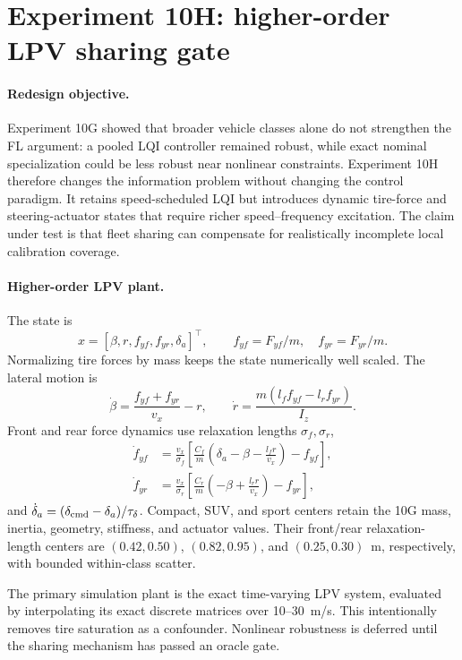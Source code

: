 \section{Experiment 10H: higher-order LPV sharing gate}
\label{sec:experiment10h}

\paragraph{Redesign objective.}
Experiment 10G showed that broader vehicle classes alone do not strengthen the
FL argument: a pooled LQI controller remained robust, while exact nominal
specialization could be less robust near nonlinear constraints. Experiment
10H therefore changes the information problem without changing the control
paradigm. It retains speed-scheduled LQI but introduces dynamic tire-force and
steering-actuator states that require richer speed--frequency excitation. The
claim under test is that fleet sharing can compensate for realistically
incomplete local calibration coverage.

\paragraph{Higher-order LPV plant.}
The state is
\begin{equation}
 x=[\beta,r,f_{yf},f_{yr},\delta_a]^\top,
 \qquad f_{yf}=F_{yf}/m,\quad f_{yr}=F_{yr}/m.
\end{equation}
Normalizing tire forces by mass keeps the state numerically well scaled. The
lateral motion is
\begin{equation}
 \dot\beta=\frac{f_{yf}+f_{yr}}{v_x}-r,
 \qquad
 \dot r=\frac{m(l_f f_{yf}-l_r f_{yr})}{I_z}.
\end{equation}
Front and rear force dynamics use relaxation lengths $\sigma_f,\sigma_r$,
\begin{align}
 \dot f_{yf}&=\frac{v_x}{\sigma_f}
 \left[\frac{C_f}{m}\left(\delta_a-\beta-\frac{l_fr}{v_x}\right)-f_{yf}\right],\\
 \dot f_{yr}&=\frac{v_x}{\sigma_r}
 \left[\frac{C_r}{m}\left(-\beta+\frac{l_rr}{v_x}\right)-f_{yr}\right],
\end{align}
and $\dot\delta_a=(\delta_{\rm cmd}-\delta_a)/\tau_\delta$. Compact, SUV,
and sport centers retain the 10G mass, inertia, geometry, stiffness, and
actuator values. Their front/rear relaxation-length centers are
$(0.42,0.50)$, $(0.82,0.95)$, and $(0.25,0.30)$~m, respectively, with bounded
within-class scatter.

The primary simulation plant is the exact time-varying LPV system, evaluated
by interpolating its exact discrete matrices over 10--30~m/s. This intentionally
removes tire saturation as a confounder. Nonlinear robustness is deferred
until the sharing mechanism has passed an oracle gate.

